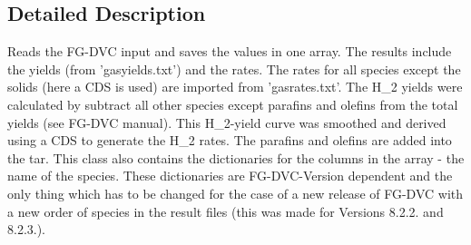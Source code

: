 \subsection{\-Detailed \-Description}
\begin{DoxyVerb}Reads the FG-DVC input and saves the values in one array. The results include the yields (from 'gasyields.txt') and the rates. The rates for all species except the solids (here a CDS is used) are imported from 'gasrates.txt'. The H_2 yields were calculated by subtract all other species except parafins and olefins from the total yields (see FG-DVC manual). This H_2-yield curve was smoothed and derived using a CDS to generate the H_2 rates. The parafins and olefins are added into the tar. This class also contains the dictionaries for the columns in the array - the name of the species. These dictionaries are FG-DVC-Version dependent and the only thing which has to be changed for the case of a new release of FG-DVC with a new order of species in the result files (this was made for Versions 8.2.2. and 8.2.3.).\end{DoxyVerb}
 

